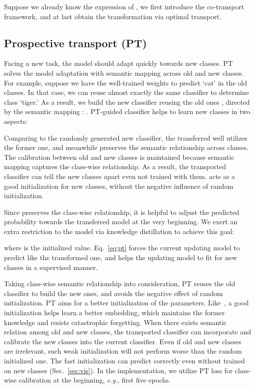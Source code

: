 \documentclass[sigconf]{acmart}
\newcommand{\eg}{\emph{e.g.}}
\begin{document}
Suppose we already know the expression of , we first introduce the co-transport framework, and at last obtain the transformation  via optimal transport.




\subsection{Prospective transport (PT)}
Facing a new task, the model should adapt quickly towards new classes. PT solves the model adaptation with semantic mapping  across old and new classes.
For example, suppose we have the well-trained weights to predict `cat' in the old classes. In that case, we can reuse almost exactly the same classifier to determine class `tiger.' As a result, we build the new classifier  reusing the old ones , directed by the semantic mapping : . PT-guided classifier helps to learn new classes in two aspects:

 Comparing to the randomly generated new classifier, the transferred  well utilizes the former one, and meanwhile preserves the semantic relationship across classes. The calibration between old and new classes is maintained because semantic mapping captures the class-wise relationship. As a result, the transported classifier can tell  the new classes apart even not trained with them.  acts as a good initialization for new classes, without the negative influence of random initialization.

 Since  preserves the class-wise relationship, it is helpful to adjust the predicted probability towards the transferred model at the very beginning.
We exert an extra restriction to the model via knowledge distillation to achieve this goal:

where  is the initialized value. Eq.~\ref{eq:pt} forces the current updating model to predict like the transformed one, and helps the updating model 
to fit for new classes in a supervised manner.

 Taking class-wise semantic relationship into consideration, PT reuses the old  classifier to build the new ones, and avoids the negative effect of random initialization.
PT aims for a better initialization of the parameters. Like~\cite{arnold2021maml}, a good initialization helps learn a better embedding, which maintains the former knowledge and resists catastrophic forgetting.
When there exists semantic relation among old and new classes, the transported classifier can incorporate and calibrate the new classes into the current classifier.
{Even if old and new classes are irrelevant, such weak initialization will not perform worse than the random initialized one.} The fast initialization can predict correctly even without trained on new classes (Sec.~\ref{sec:vis}). In the implementation, we utilize PT loss for class-wise calibration at the beginning, \eg, first five epochs.
\end{document}
